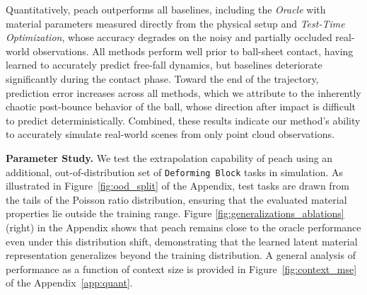 Quantitatively, \gls{peach} outperforms all baselines, including the \textit{Oracle} with material parameters measured directly from the physical setup and \textit{Test-Time Optimization}, whose accuracy degrades on the noisy and partially occluded real-world observations.
All methods perform well prior to ball-sheet contact, having learned to accurately predict free-fall dynamics, but baselines deteriorate significantly during the contact phase. 
Toward the end of the trajectory, prediction error increases across all methods, which we attribute to the inherently chaotic post-bounce behavior of the ball, whose direction after impact is difficult to predict deterministically.
Combined, these results indicate our method's ability to accurately simulate real-world scenes from only point cloud observations.


\textbf{Parameter Study.}
We test the extrapolation capability of \gls{peach} using an additional, out-of-distribution set of \texttt{Deforming Block} tasks in simulation. As illustrated in Figure~\ref{fig:ood_split} of the Appendix, test tasks are drawn from the tails of the Poisson ratio distribution, ensuring that the evaluated material properties lie outside the training range.
Figure \ref{fig:generalizations_ablations} (right) in the Appendix shows that \gls{peach} remains close to the oracle performance even under this distribution shift, demonstrating that the learned latent material representation generalizes beyond the training distribution.
A general analysis of performance as a function of context size is provided in Figure~\ref{fig:context_mse} of the Appendix~\ref{app:quant}.



